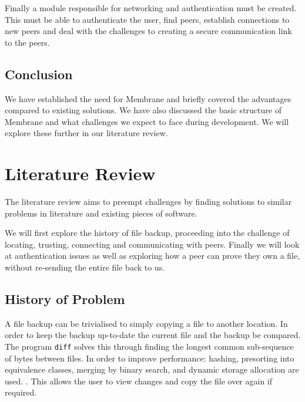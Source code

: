\documentclass[11pt, a4paper, twoside]{report}
\def\code#1{\texttt{#1}}
\begin{document}
Finally a module responsible for networking and authentication must be created. This must be able to authenticate the user, find peers, establish connections to new peers and deal with the challenges to creating a secure communication link to the peers.

\section{Conclusion}

We have established the need for Membrane and briefly covered the advantages compared to existing solutions. We have also discussed the basic structure of Membrane and what challenges we expect to face during development. We will explore these further in our literature review.

\chapter{Literature Review}

The literature review aims to preempt challenges by finding solutions to similar problems in literature and existing pieces of software.

We will first explore the history of file backup, proceeding into the challenge of locating, trusting, connecting and communicating with peers. Finally we will look at authentication issues as well as exploring how a peer can prove they own a file, without re-sending the entire file back to us.

\section{History of Problem}

A file backup can be trivialised to simply copying a file to another location. In order to keep the backup up-to-date the current file and the backup be compared. The program \code{diff} solves this through finding the longest common sub-sequence of bytes between files. In order to improve performance: hashing, presorting into equivalence classes, merging by binary search, and dynamic storage allocation are used. \citep{hunt1976algorithm}. This allows the user to view changes and copy the file over again if required.
\end{document}
